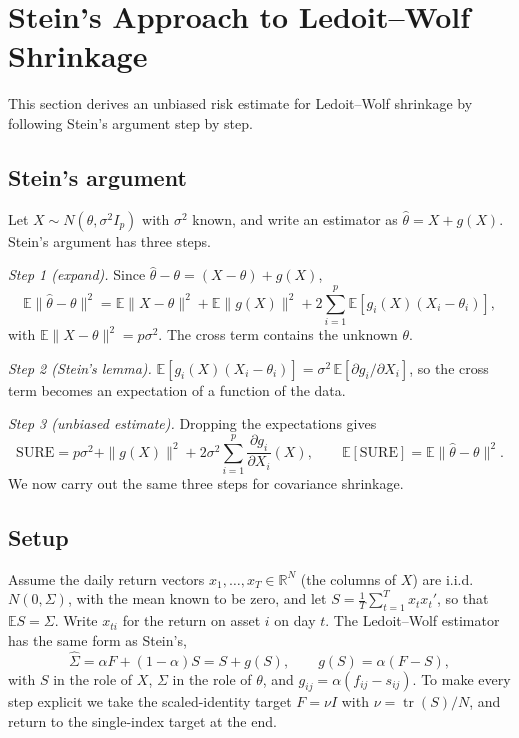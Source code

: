 \section{Stein's Approach to Ledoit--Wolf Shrinkage}\label{sec:stein}

This section derives an unbiased risk estimate for Ledoit--Wolf shrinkage by following Stein's argument step by step.

\subsection{Stein's argument}

Let $X \sim N(\theta, \sigma^2 I_p)$ with $\sigma^2$ known, and write an estimator as $\hat\theta = X + g(X)$. Stein's argument has three steps.

\emph{Step 1 (expand).} Since $\hat\theta - \theta = (X - \theta) + g(X)$,
\[
  \mathbb{E}\|\hat\theta - \theta\|^2 = \mathbb{E}\|X - \theta\|^2 + \mathbb{E}\|g(X)\|^2 + 2\sum_{i=1}^p \mathbb{E}\left[ g_i(X)(X_i - \theta_i) \right],
\]
with $\mathbb{E}\|X - \theta\|^2 = p\sigma^2$. The cross term contains the unknown $\theta$.

\emph{Step 2 (Stein's lemma).} $\mathbb{E}[g_i(X)(X_i - \theta_i)] = \sigma^2\, \mathbb{E}[\partial g_i/\partial X_i]$, so the cross term becomes an expectation of a function of the data.

\emph{Step 3 (unbiased estimate).} Dropping the expectations gives
\[
  \mathrm{SURE} = p\sigma^2 + \|g(X)\|^2 + 2\sigma^2 \sum_{i=1}^p \frac{\partial g_i}{\partial X_i}(X), \qquad \mathbb{E}[\mathrm{SURE}] = \mathbb{E}\|\hat\theta - \theta\|^2 .
\]
We now carry out the same three steps for covariance shrinkage.

\subsection{Setup}

Assume the daily return vectors $x_1, \dots, x_T \in \mathbb{R}^N$ (the columns of $X$) are i.i.d.\ $N(0, \Sigma)$, with the mean known to be zero, and let $S = \frac{1}{T}\sum_{t=1}^T x_t x_t'$, so that $\mathbb{E}S = \Sigma$. Write $x_{ti}$ for the return on asset $i$ on day $t$. The Ledoit--Wolf estimator has the same form as Stein's,
\[
  \hat\Sigma = \alpha F + (1-\alpha) S = S + g(S), \qquad g(S) = \alpha(F - S),
\]
with $S$ in the role of $X$, $\Sigma$ in the role of $\theta$, and $g_{ij} = \alpha(f_{ij} - s_{ij})$. To make every step explicit we take the scaled-identity target $F = \nu I$ with $\nu = \operatorname{tr}(S)/N$, and return to the single-index target at the end.

